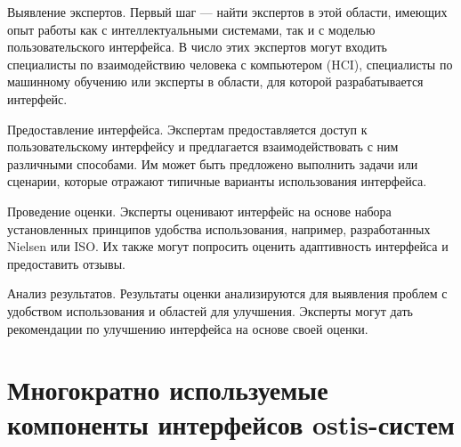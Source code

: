 \begin{textitemize}
\item Выявление экспертов. Первый шаг — найти экспертов в этой области, имеющих опыт работы как с интеллектуальными системами, так и с моделью пользовательского интерфейса. В число этих экспертов могут входить специалисты по взаимодействию человека с компьютером (HCI), специалисты по машинному обучению или эксперты в области, для которой разрабатывается интерфейс.
\item Предоставление интерфейса. Экспертам предоставляется доступ к пользовательскому интерфейсу и предлагается взаимодействовать с ним различными способами. Им может быть предложено выполнить задачи или сценарии, которые отражают типичные варианты использования интерфейса.
\item Проведение оценки. Эксперты оценивают интерфейс на основе набора установленных принципов удобства использования, например, разработанных Nielsen или ISO. Их также могут попросить оценить адаптивность интерфейса и предоставить отзывы.
\item Анализ результатов. Результаты оценки анализируются для выявления проблем с удобством использования и областей для улучшения. Эксперты могут дать рекомендации по улучшению интерфейса на основе своей оценки.
\end{textitemize}

\section{Многократно используемые компоненты интерфейсов ostis-систем}
\label{sec_reusable_UI_components}

%